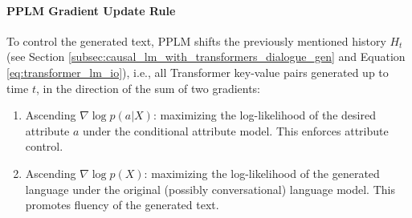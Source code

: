 
\paragraph{PPLM Gradient Update Rule} To control the generated text, PPLM shifts the previously mentioned history $H_t$ (see Section \ref{subsec:causal_lm_with_transformers_dialogue_gen} and Equation \ref{eq:transformer_lm_io}), i.e., all Transformer key-value pairs generated up to time $t$, in the direction of the sum of two gradients:

\begin{enumerate}
    \item Ascending $\nabla \log p(a | X)$: maximizing the log-likelihood of the desired attribute $a$ under the conditional attribute model. This enforces attribute control.
    \item Ascending $\nabla \log p(X)$: maximizing the log-likelihood of the generated language under the original (possibly conversational) language model. This promotes fluency of the generated text.
\end{enumerate}

